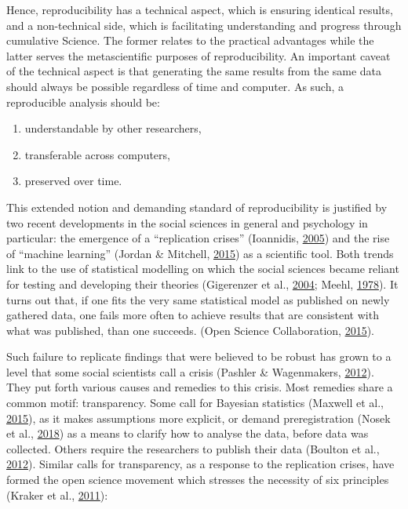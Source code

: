 \documentclass[12pt,a4paper,twoside]{article}
\providecommand{\tightlist}{%
  \setlength{\itemsep}{0pt}\setlength{\parskip}{0pt}}
\begin{document}
Hence, reproducibility has a technical aspect, which is ensuring identical results, and a non-technical side, which is facilitating understanding and progress through cumulative Science.
The former relates to the practical advantages while the latter serves the metascientific purposes of reproducibility.
An important caveat of the technical aspect is that generating the same results from the same data should always be possible regardless of time and computer.
As such, a reproducible analysis should be:

\begin{enumerate}
\def\labelenumi{\arabic{enumi}.}
\tightlist
\item
  understandable by other researchers,
\item
  transferable across computers,
\item
  preserved over time.
\end{enumerate}

This extended notion and demanding standard of reproducibility is justified by two recent developments in the social sciences in general and psychology in particular: the emergence of a ``replication crises'' (Ioannidis, \protect\hyperlink{ref-ioannidisWhyMostPublished2005}{2005}) and the rise of ``machine learning'' (Jordan \& Mitchell, \protect\hyperlink{ref-jordanMachineLearningTrends2015}{2015}) as a scientific tool.
Both trends link to the use of statistical modelling on which the social sciences became reliant for testing and developing their theories (Gigerenzer et al., \protect\hyperlink{ref-gigerenzerNullRitualWhat2004}{2004}; Meehl, \protect\hyperlink{ref-meehlTheoreticalRisksTabular1978}{1978}).
It turns out that, if one fits the very same statistical model as published on newly gathered data, one fails more often to achieve results that are consistent with what was published, than one succeeds. (Open Science Collaboration, \protect\hyperlink{ref-opensciencecollaborationEstimatingReproducibilityPsychological2015}{2015}).

Such failure to replicate findings that were believed to be robust has grown to a level that some social scientists call a crisis (Pashler \& Wagenmakers, \protect\hyperlink{ref-pashlerEditorsIntroductionSpecial2012}{2012}).
They put forth various causes and remedies to this crisis.
Most remedies share a common motif: transparency.
Some call for Bayesian statistics (Maxwell et al., \protect\hyperlink{ref-maxwellPsychologySufferingReplication2015}{2015}), as it makes assumptions more explicit, or demand preregistration (Nosek et al., \protect\hyperlink{ref-nosekPreregistrationRevolution2018}{2018}) as a means to clarify how to analyse the data, before data was collected.
Others require the researchers to publish their data (Boulton et al., \protect\hyperlink{ref-boultonScienceOpenEnterprise2012}{2012}).
Similar calls for transparency, as a response to the replication crises, have formed the open science movement which stresses the necessity of six principles (Kraker et al., \protect\hyperlink{ref-krakerCaseOpenScience2011}{2011}):
\end{document}
